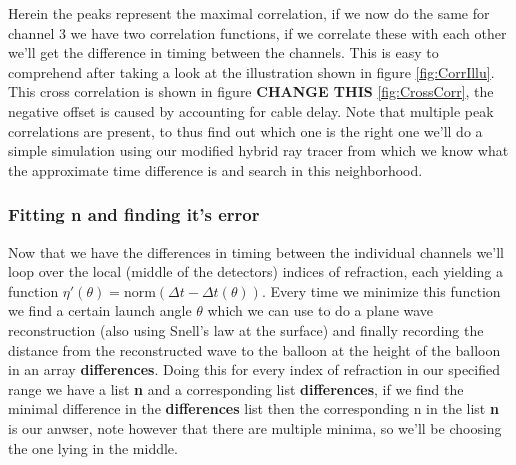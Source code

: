 Herein the peaks represent the maximal correlation, if we now do the same for
channel 3 we have two correlation functions, if we correlate these with
each other we'll get the difference in timing between the channels.  This is
easy to comprehend after taking a look at the illustration shown in figure
\ref{fig:CorrIllu}. This cross correlation is shown in figure
\textbf{CHANGE THIS}
\ref{fig:CrossCorr}, the negative offset is caused by accounting for cable
delay. Note that multiple peak correlations are present, to thus find out which
one is the right one we'll do a simple simulation using our modified hybrid ray
tracer from which we know what the approximate time difference is and search in
this neighborhood.

\subsubsection{Fitting n and finding it's error}
Now that we have the differences in timing between the individual channels
we'll loop over the local (middle of the detectors) indices of refraction, each
yielding a function $\eta'(\theta) = \text{norm}(\Delta t - \Delta t(\theta))$. Every time we minimize this function we find a certain launch angle $\theta$ which we can use to do a plane wave reconstruction (also using Snell's law at the surface) and finally
recording the distance from the reconstructed wave to the balloon at the
height of the balloon in an array \textbf{differences}.  Doing this for every index of refraction in our specified range we have a
list \textbf{n} and a corresponding list \textbf{differences}, if we find the minimal
difference in the \textbf{differences} list then the corresponding n in the
list \textbf{n} is our anwser, note however that there are multiple
minima, so we'll be choosing the one lying in the middle.

